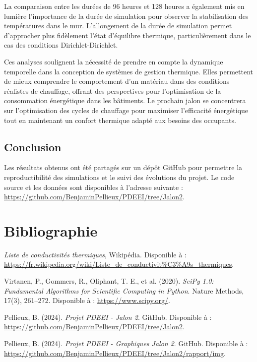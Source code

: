 \documentclass[a4paper,11pt]{article}
\begin{document}
La comparaison entre les durées de 96 heures et 128 heures a également mis en lumière l'importance de la durée de simulation pour observer la stabilisation des températures dans le mur. L'allongement de la durée de simulation permet d'approcher plus fidèlement l'état d'équilibre thermique, particulièrement dans le cas des conditions Dirichlet-Dirichlet.

Ces analyses soulignent la nécessité de prendre en compte la dynamique temporelle dans la conception de systèmes de gestion thermique. Elles permettent de mieux comprendre le comportement d'un matériau dans des conditions réalistes de chauffage, offrant des perspectives pour l'optimisation de la consommation énergétique dans les bâtiments. Le prochain jalon se concentrera sur l'optimisation des cycles de chauffage pour maximiser l'efficacité énergétique tout en maintenant un confort thermique adapté aux besoins des occupants.

\subsection{Conclusion}
Les résultats obtenus ont été partagés sur un dépôt GitHub pour permettre la reproductibilité des simulations et le suivi des évolutions du projet. Le code source et les données sont disponibles à l'adresse suivante : \url{https://github.com/BenjaminPellieux/PDEEI/tree/Jalon2}.


\newpage
\section*{Bibliographie}
\begin{thebibliography}{9}
    \textit{Liste de conductivités thermiques}, Wikipédia. Disponible à : \url{https://fr.wikipedia.org/wiki/Liste_de_conductivit%C3%A9s_thermiques}.
    
    Virtanen, P., Gommers, R., Oliphant, T. E., et al. (2020). \textit{SciPy 1.0: Fundamental Algorithms for Scientific Computing in Python}. Nature Methods, 17(3), 261–272. Disponible à : \url{https://www.scipy.org/}.
    
    Pellieux, B. (2024). \textit{Projet PDEEI - Jalon 2}. GitHub. Disponible à : \url{https://github.com/BenjaminPellieux/PDEEI/tree/Jalon2}.

    Pellieux, B. (2024). \textit{Projet PDEEI - Graphiques Jalon 2}. GitHub. Disponible à : \url{https://github.com/BenjaminPellieux/PDEEI/tree/Jalon2/rapport/img}.
\end{thebibliography}
\end{document}
